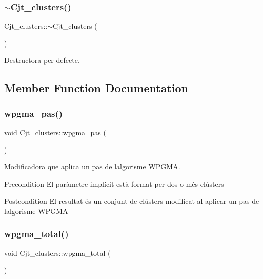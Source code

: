 \subsubsection{\texorpdfstring{$\sim$\+Cjt\+\_\+clusters()}{~Cjt\_clusters()}}
{\footnotesize\ttfamily Cjt\+\_\+clusters\+::$\sim$\+Cjt\+\_\+clusters (\begin{DoxyParamCaption}{ }\end{DoxyParamCaption})}



Destructora per defecte. 



\subsection{Member Function Documentation}
\mbox{\label{class_cjt__clusters_ae5d7fd65b9070ea2e7240d78fefd0f6e}} 
\subsubsection{\texorpdfstring{wpgma\+\_\+pas()}{wpgma\_pas()}}
{\footnotesize\ttfamily void Cjt\+\_\+clusters\+::wpgma\+\_\+pas (\begin{DoxyParamCaption}{ }\end{DoxyParamCaption})}



Modificadora que aplica un pas de l\textquotesingle{}algorisme W\+P\+G\+MA. 

\begin{DoxyPrecond}{Precondition}
El paràmetre implícit està format per dos o més clústers 
\end{DoxyPrecond}
\begin{DoxyPostcond}{Postcondition}
El resultat és un conjunt de clústers modificat al aplicar un pas de l\textquotesingle{}algorisme W\+P\+G\+MA 
\end{DoxyPostcond}
\mbox{\label{class_cjt__clusters_a755fca978c7d4b499e2c7b0963136354}} 
\subsubsection{\texorpdfstring{wpgma\+\_\+total()}{wpgma\_total()}}
{\footnotesize\ttfamily void Cjt\+\_\+clusters\+::wpgma\+\_\+total (\begin{DoxyParamCaption}{ }\end{DoxyParamCaption})}



